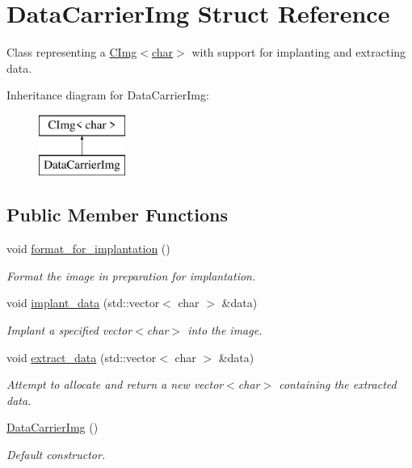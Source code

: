 \hypertarget{structDataCarrierImg}{
\section{DataCarrierImg Struct Reference}
\label{structDataCarrierImg}
}


Class representing a \hyperlink{structcimg__library_1_1CImg}{CImg$<$char$>$} with support for implanting and extracting data.  


Inheritance diagram for DataCarrierImg:\begin{figure}[H]
\begin{center}
\leavevmode
\includegraphics[height=2.000000cm]{structDataCarrierImg}
\end{center}
\end{figure}
\subsection*{Public Member Functions}
\begin{DoxyCompactItemize}
\item 
void \hyperlink{structDataCarrierImg_ad115dc610f3f7528767d4aa45fa35b66}{format\_\-for\_\-implantation} ()
\begin{DoxyCompactList}\small\item\em Format the image in preparation for implantation. \item\end{DoxyCompactList}\item 
void \hyperlink{structDataCarrierImg_a5fdd25e16c1d5b86b68acac5a24ecae4}{implant\_\-data} (std::vector$<$ char $>$ \&data)
\begin{DoxyCompactList}\small\item\em Implant a specified vector$<$char$>$ into the image. \item\end{DoxyCompactList}\item 
void \hyperlink{structDataCarrierImg_a7769dc5e2644c5c1d13cbeb7235c5304}{extract\_\-data} (std::vector$<$ char $>$ \&data)
\begin{DoxyCompactList}\small\item\em Attempt to allocate and return a new vector$<$char$>$ containing the extracted data. \item\end{DoxyCompactList}\item 
\hypertarget{structDataCarrierImg_ade2d300f665591ba4b5870dcb4afe251}{
\hyperlink{structDataCarrierImg_ade2d300f665591ba4b5870dcb4afe251}{DataCarrierImg} ()}
\label{structDataCarrierImg_ade2d300f665591ba4b5870dcb4afe251}

\begin{DoxyCompactList}\small\item\em Default constructor. \item\end{DoxyCompactList}\end{DoxyCompactItemize}


